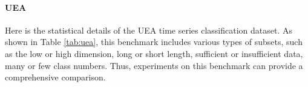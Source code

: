 \documentclass[nohyperref]{article}
\theoremstyle{plain}
\theoremstyle{definition}
\theoremstyle{remark}
\begin{document}
\begin{table}[h]
\vspace{-15pt}
	\caption{Hierarchical architecture for vision recognization task.}
	\label{tab:model_arch}
	\vskip 0.1in
	\centering
	\begin{small}
		\begin{sc}
			\renewcommand{\multirowsetup}{\centering}
		\end{sc}
	\end{small}
	\vspace{-10pt}
\end{table}


\paragraph{UEA} 
Here is the statistical details of the UEA time series classification dataset. As shown in Table \ref{tab:uea}, this benchmark includes various types of subsets, such as the low or high dimension, long or short length, sufficient or insufficient data, many or few class numbers. Thus, experiments on this benchmark can provide a comprehensive comparison. 
\end{document}
